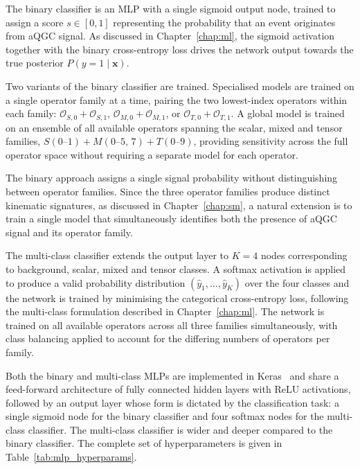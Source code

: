 The binary classifier is an MLP with a single sigmoid output node, trained to assign a score $s \in [0,1]$ representing the probability that an event originates from aQGC signal. As discussed in Chapter~\ref{chap:ml}, the sigmoid activation together with the binary cross-entropy loss drives the network output towards the true posterior $P(y=1 \mid \mathbf{x})$.

Two variants of the binary classifier are trained. Specialised models are trained on a single operator family at a time, pairing the two lowest-index operators within each family: $\mathcal{O}_{S,0}+\mathcal{O}_{S,1}$, $\mathcal{O}_{M,0}+\mathcal{O}_{M,1}$, or $\mathcal{O}_{T,0}+\mathcal{O}_{T,1}$. A global model is trained on an ensemble of all available operators spanning the scalar, mixed and tensor families, $S(0\text{--}1) + M(0\text{--}5,\,7) + T(0\text{--}9)$, providing sensitivity across the full operator space without requiring a separate model for each operator.

The binary approach assigns a single signal probability without distinguishing between operator families. Since the three operator families produce distinct kinematic signatures, as discussed in Chapter~\ref{chap:sm}, a natural extension is to train a single model that simultaneously identifies both the presence of aQGC signal and its operator family.

The multi-class classifier extends the output layer to $K=4$ nodes corresponding to background, scalar, mixed and tensor classes. A softmax activation is applied to produce a valid probability distribution $(\hat{y}_1,\dots,\hat{y}_K)$ over the four classes and the network is trained by minimising the categorical cross-entropy loss, following the multi-class formulation described in Chapter~\ref{chap:ml}. The network is trained on all available operators across all three families simultaneously, with class balancing applied to account for the differing numbers of operators per family.

Both the binary and multi-class MLPs are implemented in Keras~\cite{Chollet_Keras_2015} and share a feed-forward architecture of fully connected hidden layers with ReLU activations, followed by an output layer whose form is dictated by the classification task: a single sigmoid node for the binary classifier and four softmax nodes for the multi-class classifier. The multi-class classifier is wider and deeper compared to the binary classifier. The complete set of hyperparameters is given in Table~\ref{tab:mlp_hyperparams}.

